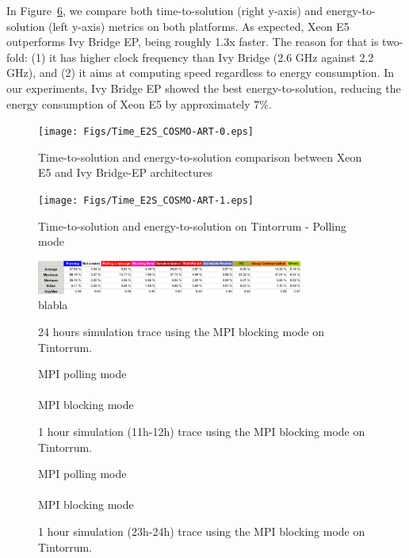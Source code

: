 In Figure~\ref{fig:3}, we compare both time-to-solution (right y-axis)
and  energy-to-solution (left  y-axis) metrics  on both  platforms. As
expected,  Xeon  E5 outperforms  Ivy  Bridge  EP,  being roughly  1.3x
faster.   The reason for  that is  two-fold: (1)  it has  higher clock
frequency than Ivy  Bridge (2.6 GHz against 2.2 GHz),  and (2) it aims
at  computing   speed  regardless   to  energy  consumption.   In  our
experiments,  Ivy  Bridge   EP  showed  the  best  energy-to-solution,
reducing the energy consumption of Xeon E5 by approximately $7\%$.

\begin{figure}[htbf]
  \texttt{[image: Figs/Time\_E2S\_COSMO-ART-0.eps]}
  \caption{Time-to-solution and energy-to-solution comparison between
    Xeon E5 and Ivy Bridge-EP architectures}
  \label{fig:3}
\end{figure}

\begin{figure}[htbf]
  \texttt{[image: Figs/Time\_E2S\_COSMO-ART-1.eps]}
  \caption{Time-to-solution and energy-to-solution on Tintorrum -
    Polling mode}
  \label{fig:3}
\end{figure}


\begin{figure}[htbf]
  \centering
  \includegraphics[width=0.78\textwidth]{Figs/23_24_blq1_stat1.eps}
  \caption{blabla}
  \label{fig:3}
\end{figure}


\begin{figure}[htbf]
  \centering
  \scalebox{0.5}{}
  \caption{24 hours simulation trace using the MPI blocking mode on Tintorrum.}
  \label{fig:3}
\end{figure}

\begin{figure}[htbf]
  \centering
  \scriptsize
  MPI polling mode\\
  \scalebox{0.5}{}\\
  MPI blocking mode\\
  \scalebox{0.5}{}
  \caption{1 hour simulation (11h-12h) trace using the MPI blocking mode on Tintorrum.}
  \label{fig:3}
\end{figure}

\begin{figure}[htbf]
  \centering
  \scriptsize
  MPI polling mode\\
  \scalebox{0.5}{}\\
  MPI blocking mode\\
  \scalebox{0.5}{}
  \caption{1 hour simulation (23h-24h) trace using the MPI blocking mode on Tintorrum.}
  \label{fig:3}
\end{figure}



